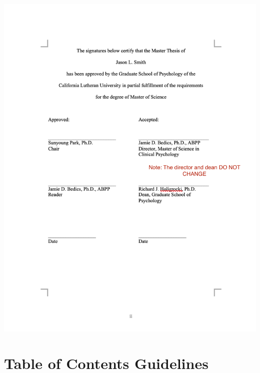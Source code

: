 \documentclass[openany]{book}
\begin{document}
\includegraphics[width=13.94in]{images/signaturepage}

\hypertarget{table-of-contents-guidelines}{%
\section{Table of Contents Guidelines}\label{table-of-contents-guidelines}}
\end{document}
